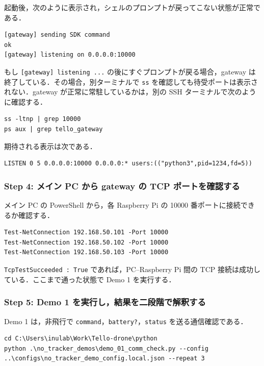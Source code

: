 起動後，次のように表示され，シェルのプロンプトが戻ってこない状態が正常である．

\begin{lstlisting}
[gateway] sending SDK command
ok
[gateway] listening on 0.0.0.0:10000
\end{lstlisting}

もし \texttt{[gateway] listening ...} の後にすぐプロンプトが戻る場合，gateway は終了している．その場合，別ターミナルで \texttt{ss} を確認しても待受ポートは表示されない．gateway が正常に常駐しているかは，別の SSH ターミナルで次のように確認する．

\begin{lstlisting}
ss -ltnp | grep 10000
ps aux | grep tello_gateway
\end{lstlisting}

期待される表示は次である．

\begin{lstlisting}
LISTEN 0 5 0.0.0.0:10000 0.0.0.0:* users:(("python3",pid=1234,fd=5))
\end{lstlisting}

\subsubsection{Step 4: メイン PC から gateway の TCP ポートを確認する}

メイン PC の PowerShell から，各 Raspberry Pi の 10000 番ポートに接続できるか確認する．

\begin{lstlisting}
Test-NetConnection 192.168.50.101 -Port 10000
Test-NetConnection 192.168.50.102 -Port 10000
Test-NetConnection 192.168.50.103 -Port 10000
\end{lstlisting}

\texttt{TcpTestSucceeded : True} であれば，PC--Raspberry Pi 間の TCP 接続は成功している．ここまで通った状態で Demo 1 を実行する．

\subsubsection{Step 5: Demo 1 を実行し，結果を二段階で解釈する}

Demo 1 は，非飛行で \texttt{command}，\texttt{battery?}，\texttt{status} を送る通信確認である．

\begin{lstlisting}
cd C:\Users\inulab\Work\Tello-drone\python
python .\no_tracker_demos\demo_01_comm_check.py --config ..\configs\no_tracker_demo_config.local.json --repeat 3
\end{lstlisting}

